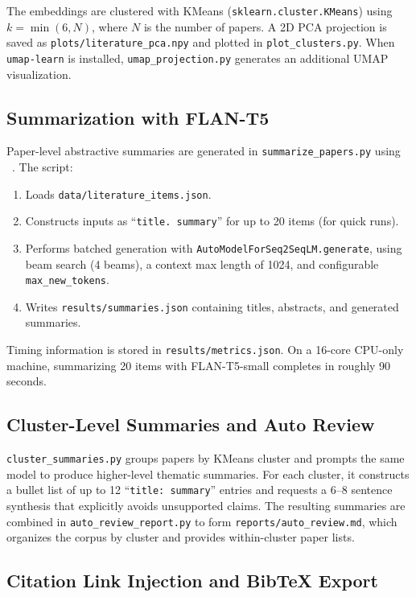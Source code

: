 \documentclass[11pt]{article}
\begin{document}
The embeddings are clustered with KMeans (\verb|sklearn.cluster.KMeans|) using $k = \min(6, N)$, where $N$ is the number of papers. A 2D PCA projection is saved as \verb|plots/literature_pca.npy| and plotted in \verb|plot_clusters.py|. When \verb|umap-learn| is installed, \verb|umap_projection.py| generates an additional UMAP visualization.

\subsection{Summarization with FLAN-T5}

Paper-level abstractive summaries are generated in \verb|summarize_papers.py| using ~\citep{raffel2020t5,chung2022scaling}. The script:

\begin{enumerate}[leftmargin=1.5em]
\item Loads \verb|data/literature_items.json|.
\item Constructs inputs as ``\verb|title. summary|'' for up to 20 items (for quick runs).
\item Performs batched generation with \verb|AutoModelForSeq2SeqLM.generate|, using beam search (4 beams), a context max length of 1024, and configurable \verb|max_new_tokens|.
\item Writes \verb|results/summaries.json| containing titles, abstracts, and generated summaries.
\end{enumerate}

Timing information is stored in \verb|results/metrics.json|. On a 16-core CPU-only machine, summarizing 20 items with FLAN-T5-small completes in roughly 90 seconds.

\subsection{Cluster-Level Summaries and Auto Review}

\verb|cluster_summaries.py| groups papers by KMeans cluster and prompts the same model to produce higher-level thematic summaries. For each cluster, it constructs a bullet list of up to 12 ``\verb|title: summary|'' entries and requests a 6--8 sentence synthesis that explicitly avoids unsupported claims. The resulting summaries are combined in \verb|auto_review_report.py| to form \verb|reports/auto_review.md|, which organizes the corpus by cluster and provides within-cluster paper lists.

\subsection{Citation Link Injection and BibTeX Export}
\end{document}

